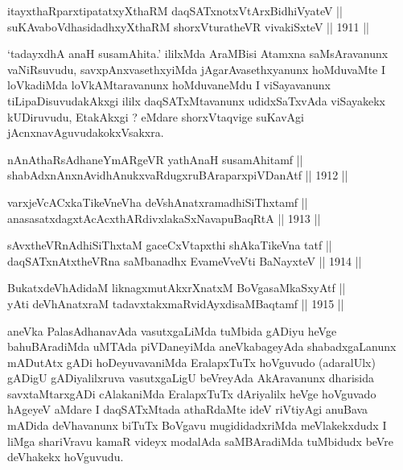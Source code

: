 \begin{shl}
itayxthaRparxtipatatxyXthaRM daqSATxnotxV\s tArxBidhiVyateV || \\
suKAvaboVdhasidadhxyXthaRM shorxVturatheVR vivakiSxteV \hfill || 1911 ||
  
\end{shl}

\begin{artha}
`tadayxdhA anaH susamAhita.' ililxMda AraMBisi Atamxna saMsAravanunx vaNiRsuvudu,
savxpAnxvasethxyiMda jAgarAvasethxyanunx hoMduvaMte I loVkadiMda
loVkAMtaravanunx hoMduvaneMdu I viSayavanunx tiLipaDisuvudakAkxgi
ililx daqSATxMtavanunx udidxSaTxvAda viSayakekx kUDiruvudu,
EtakAkxgi ? eMdare shorxVtaqvige suKavAgi jAcnxnavAguvudakokxVsakxra.
\end{artha}


\begin{shl}
nAnAthaRsAdhaneYmARgeVR yathA\s naH susamAhitamf || \\
shabAdxnAnxnAvidhAnukxvaRdugxruBAraparxpiVDanAtf \hfill || 1912 ||
  
\end{shl}

\begin{shl}
varxjeVcACxkaTikeVneVha deVshAnatxramadhiSiThxtamf || \\
anasasatxdagxtAcAcxthARdivxlakaSxNavapuBaqRtA \hfill || 1913 ||
  
\end{shl}

\begin{shl}
sAvxtheVRnAdhiSiThxtaM gaceCxVtapxthi shAkaTikeVna tatf || \\
daqSATxnAtxtheVRna saMbanadhx EvameVveVti BaNayxteV \hfill || 1914 ||
  
\end{shl}

\begin{shl}
BukatxdeVhAdidaM liknagxmutAkxrXnatxM BoVgasaMkaSxyAtf || \\
yAti deVhAnatxraM tadavxtakxmaRvidAyxdisaMBaqtamf \hfill || 1915 ||
  
\end{shl}

\begin{artha}
aneVka PalasAdhanavAda vasutxgaLiMda tuMbida gADiyu heVge
bahuBAradiMda uMTAda piVDaneyiMda aneVkabageyAda shabadxgaLanunx
mADutAtx gADi hoDeyuvavaniMda EralapxTuTx hoVguvudo (adaralUlx) gADigU
gADiyalilxruva vasutxgaLigU beVreyAda AkAravanunx dharisida
savxtaMtarxgADi cAlakaniMda EralapxTuTx dAriyalilx heVge hoVguvado
hAgeyeV aMdare I daqSATxMtada athaRdaMte ideV riVtiyAgi anuBava mADida
deVhavanunx biTuTx BoVgavu mugididadxriMda meVlakekxdudx I liMga
shariVravu kamaR videyx modalAda saMBAradiMda tuMbidudx beVre
deVhakekx hoVguvudu.
\end{artha}

